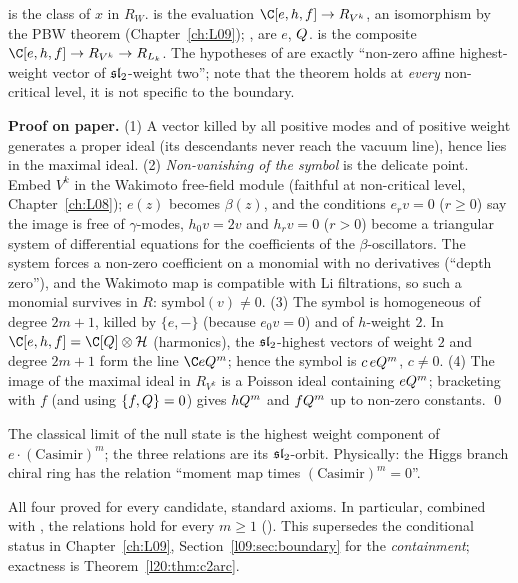 \begin{dictionary}
 is the class of $x$ in $R_W$.  is the evaluation
$\C[e,h,f]\to R_{V^k}$, an isomorphism by the PBW theorem (Chapter~\ref{ch:L09}); , 
are $e$, $Q$.  is the composite $\C[e,h,f]\to R_{V^k}\to R_{L_k}$. The hypotheses of
 are exactly ``non-zero affine highest-weight vector of $\mathfrak{sl}_2$-weight
two''; note that the theorem holds at \emph{every} non-critical level, it is not specific to the boundary.
\end{dictionary}

\textbf{Proof on paper.} (1) A vector killed by all positive modes and of positive weight generates a proper
ideal (its descendants never reach the vacuum line), hence lies in the maximal ideal. (2) \emph{Non-vanishing of
the symbol} is the delicate point. Embed $V^k$ in the Wakimoto free-field module (faithful at non-critical level,
Chapter~\ref{ch:L08}); $e(z)$ becomes $\beta(z)$, and the conditions $e_rv=0$ ($r\ge0$) say the image is free of
$\gamma$-modes, $h_0v=2v$ and $h_rv=0$ ($r>0$) become a triangular system of differential equations for the
coefficients of the $\beta$-oscillators. The system forces a non-zero coefficient on a monomial with no
derivatives (``depth zero''), and the Wakimoto map is compatible with Li filtrations, so such a monomial
survives in $R$: $\mathrm{symbol}(v)\neq0$. (3) The symbol is homogeneous of degree $2m+1$, killed by
$\{e,-\}$ (because $e_0v=0$) and of $h$-weight $2$. In $\C[e,h,f]=\C[\ltwentyQ]\otimes\mathcal H$ (harmonics), the
$\mathfrak{sl}_2$-highest vectors of weight $2$ and degree $2m+1$ form the line $\C e\ltwentyQ^m$; hence the symbol is $c\,eQ^m$,
$c\neq0$. (4) The image of the maximal ideal in $R_{V^k}$ is a Poisson ideal containing $eQ^m$; bracketing
with $f$ (and using $\{f,Q\}=0$) gives $hQ^m$ and $fQ^m$ up to non-zero constants. \qed

\begin{physics}
The classical limit of the null state is the highest weight component of $e\cdot(\text{Casimir})^m$; the
three relations are its $\mathfrak{sl}_2$-orbit. Physically: the Higgs branch chiral ring has the relation
``moment map times $(\text{Casimir})^m=0$''.
\end{physics}

\begin{status}
All four proved for every candidate, standard axioms. In particular, combined with
, the relations hold for every $m\ge1$
(). This supersedes the conditional status in Chapter~\ref{ch:L09},
Section~\ref{l09:sec:boundary} for the \emph{containment}; exactness is Theorem~\ref{l20:thm:c2arc}.
\end{status}


